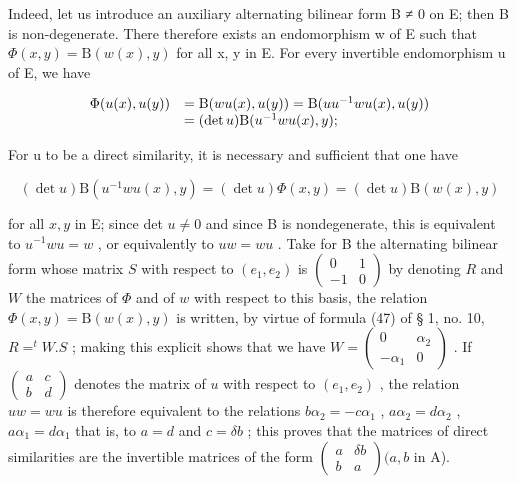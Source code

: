 Indeed, let us introduce an auxiliary alternating bilinear form B ≠ 0 on E; then B is non-degenerate. There therefore exists an endomorphism w of E such that \(\Phi(x, y) = \mathrm{B}(w(x), y)\) for all x, y in E. For every invertible endomorphism u of E, we have

\[
\begin{array}{r l} \Phi (u (x), u (y)) & = \mathrm{B} (w u (x), u (y)) = \mathrm{B} (u u ^ {- 1} w u (x), u (y)) \\ & = (\det u) \mathrm{B} (u ^ {- 1} w u (x), y); \end{array}
\]

For u to be a direct similarity, it is necessary and sufficient that one have

\[
(\det u) \mathrm{B} (u ^ {- 1} w u (x), y) = (\det u) \Phi (x, y) = (\det u) \mathrm{B} (w (x), y)
\]

for all \(x, y\) in E; since det \(u \neq 0\) and since B is nondegenerate, this is equivalent to \(u^{-1}wu = w\) , or equivalently to \(uw = wu\) . Take for B the alternating bilinear form whose matrix \(S\) with respect to \((e_1, e_2)\) is \(\begin{pmatrix} 0 & 1 \\ -1 & 0 \end{pmatrix}\) by denoting \(R\) and \(W\) the matrices of \(\Phi\) and of \(w\) with respect to this basis, the relation \(\Phi(x, y) = \mathrm{B}(w(x), y)\) is written, by virtue of formula (47) of § 1, no. 10, \(R = ^t W.S\) ; making this explicit shows that we have \(W = \begin{pmatrix} 0 & \alpha_2 \\ -\alpha_1 & 0 \end{pmatrix}\) . If \(\begin{pmatrix} a & c \\ b & d \end{pmatrix}\) denotes the matrix of \(u\) with respect to \((e_1, e_2)\) , the relation \(uw = wu\) is therefore equivalent to the relations \(b\alpha_2 = -c\alpha_1\) , \(a\alpha_2 = d\alpha_2\) , \(a\alpha_1 = d\alpha_1\) that is, to \(a = d\) and \(c = \delta b\) ; this proves that the matrices of direct similarities are the invertible matrices of the form \(\begin{pmatrix} a & \delta b \\ b & a \end{pmatrix}(a, b\) in A).

